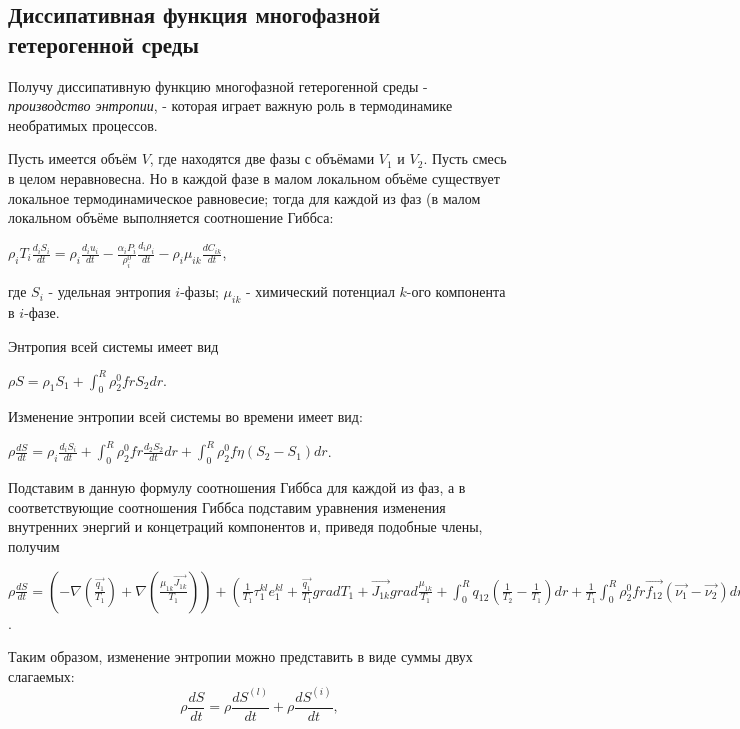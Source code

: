 \documentclass[12pt, a4paper]{report}
\begin{document}
	\subsection*{Диссипативная функция многофазной гетерогенной среды}
	\large
	Получу диссипативную функцию многофазной гетерогенной среды - \textit{производство энтропии}, - которая играет важную роль в термодинамике необратимых процессов. \par
	Пусть имеется объём $V$, где находятся две фазы с объёмами $V_{1}$ и $V_{2}$. Пусть смесь в целом неравновесна. Но в каждой фазе в малом локальном объёме существует локальное термодинамическое равновесие; тогда для каждой из фаз (в малом локальном объёме выполняется соотношение Гиббса:
	\begin{center}
		$\rho_{i} T_{i} \frac{d_{i} S_{i}}{dt} = \rho_{i} \frac{d_{i} u_{i}}{dt} - \frac{\alpha_{i} P_{i}}{\rho_{i}^{0}}\frac{d_{i} \rho_{i}}{dt} - \rho_{i} \mu_{ik} \frac{d C_{ik}}{dt}$,
	\end{center}
	где $S_{i}$ - удельная энтропия $i$-фазы; $\mu_{ik}$ - химический потенциал $k$-ого компонента в $i$-фазе. \par
	Энтропия всей системы имеет вид
	\begin{center}
		$\rho S = \rho_{1}S_{1} + \int_{0}^{R} \rho_{2}^{0} f r S_{2} dr$.
	\end{center}
	\par
	Изменение энтропии всей системы во времени имеет вид:
	\begin{center}
		$\rho \frac{dS}{dt} = \rho_{i} \frac{d_{i} S_{i}}{dt} + \int_{0}^{R} \rho_{2}^{0} f r \frac{d_{2} S_{2}}{dt} dr + \int_{0}^{R} \rho_{2}^{0} f \eta (S_{2} - S_{1}) dr$.
	\end{center}
	\par
	Подставим в данную формулу соотношения Гиббса для каждой из фаз, а в соответствующие соотношения Гиббса подставим уравнения изменения внутренних энергий и концетраций компонентов и, приведя подобные члены, получим
	\begin{center}
		$\rho \frac{dS}{dt} = (-\nabla(\frac{\vec{q_{1}}}{T_{1}}) + \nabla(\frac{\mu_{1k} \vec{J_{1k}}}{T_{1}})) + (\frac{1}{T_{1}} \tau_{1}^{kl} e_{1}^{kl} + \frac{\vec{q_{1}}}{T_{1}} gradT_{1} + \vec{J_{1k}} grad \frac{\mu_{1k}}{T_{1}} + \int_{0}^{R} q_{12} (\frac{1}{T_{2}} - \frac{1}{T_{1}}) dr + \frac{1}{T_{1}} \int_{0}^{R} \rho_{2}^{0} f r \vec{f_{12}} (\vec{\nu_{1}} - \vec{\nu_{2}}) dr + \int_{0}^{R} \rho_{2}^{0} f \eta ((\frac{\mu_{1k}}{T_{2}} - \frac{\mu_{2k}}{T_{2}}) + i_{1}(\frac{1}{T_{2}} - \frac{1}{T_{1}})) dr)$.
	\end{center}
	\par
	Таким образом, изменение энтропии можно представить в виде суммы двух слагаемых:
	\begin{equation}
		\rho \frac{dS}{dt} = \rho \frac{dS^{(l)}}{dt} + \rho \frac{dS^{(i)}}{dt},
	\end{equation}
\end{document}
